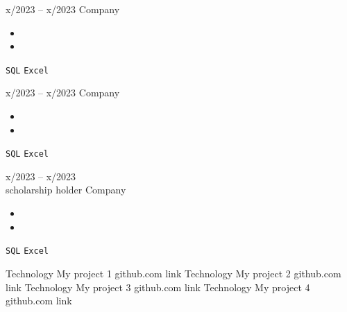 \documentclass[9pt]{developercv} %
\begin{document}
\vspace{-10 pt}
\begin{entrylist}
	\entry
        {x/2023 -- x/2023}
		{\lipsum[1][1]}
		{Company}
		{\vspace{-10pt}
        \begin{itemize}[noitemsep,topsep=0pt,parsep=0pt,partopsep=0pt, leftmargin=-1pt]
            \item \lipsum[1][1-2]
            \item \lipsum[1][3-4]
        \end{itemize}
        \texttt{SQL} \slashsep \texttt{Excel}}
	\entry
		{x/2023 -- x/2023}
		{\lipsum[1][1]}
		{Company}
		{\vspace{-10pt}
        \begin{itemize}[noitemsep,topsep=0pt,parsep=0pt,partopsep=0pt, leftmargin=-1pt]
            \item \lipsum[1][1-2]
            \item \lipsum[1][3-4]
        \end{itemize}
        \texttt{SQL} \slashsep \texttt{Excel}}
	\entry
		{x/2023 -- x/2023 \\\footnotesize{scholarship holder}}
		{\lipsum[1][1]}
		{Company}
		{\vspace{-10pt}
        \begin{itemize}[noitemsep,topsep=0pt,parsep=0pt,partopsep=0pt, leftmargin=-1pt]
            \item \lipsum[1][1-2]
            \item \lipsum[1][3-4]
        \end{itemize}
        \texttt{SQL} \slashsep \texttt{Excel}}
\end{entrylist}



\begin{entrylist}
    \entry
		{Technology}
		{My project 1}
		{github.com link}
		{%
        \lipsum[1][1-3]}
    \entry
		{Technology}
		{My project 2}
		{github.com link}
		{%
        \lipsum[1][1-3]}
	\entry
		{Technology}
		{My project 3}
		{github.com link}
		{%
        \lipsum[1][1-3]}
    \entry
		{Technology}
		{My project 4}
		{github.com link}
		{%
        \lipsum[1][1-3]}
\end{entrylist}
\end{document}
